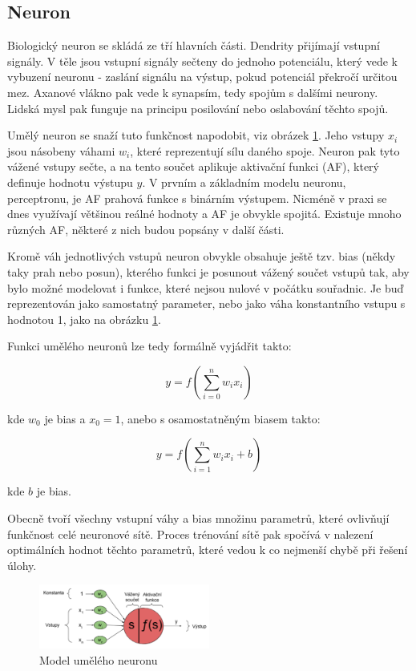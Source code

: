 \subsection{Neuron}
Biologický neuron se skládá ze tří hlavních části. Dendrity přijímají vstupní
signály. V těle jsou vstupní signály sečteny do jednoho potenciálu, který vede
k vybuzení neuronu - zaslání signálu na výstup, pokud potenciál překročí
určitou mez. Axanové vlákno pak vede k synapsím, tedy spojům s dalšími neurony.
Lidská mysl pak funguje na principu posilování nebo oslabování těchto spojů.

Umělý neuron se snaží tuto funkčnost napodobit, viz obrázek \ref{fig:neuron}.
Jeho vstupy $x_i$ jsou násobeny váhami $w_i$, které reprezentují sílu daného
spoje. Neuron pak tyto vážené vstupy sečte, a na tento součet aplikuje
aktivační funkci (AF), který definuje hodnotu výstupu $y$. V prvním a základním
modelu neuronu, perceptronu, je AF prahová funkce s binárním výstupem. Nicméně
v praxi se dnes využívají většinou reálné hodnoty a AF je obvykle spojitá.
\cite{Vondrak1994} Existuje mnoho různých AF, některé z nich budou popsány v
další části.

Kromě váh jednotlivých vstupů neuron obvykle obsahuje ještě tzv. bias (někdy
taky prah nebo posun), kterého funkci je posunout vážený součet vstupů tak, aby
bylo možné modelovat i funkce, které nejsou nulové v počátku souřadnic. Je buď
reprezentován jako samostatný parameter, nebo jako váha konstantního vstupu s
hodnotou 1, jako na obrázku \ref{fig:neuron}.

Funkci umělého neuronů lze tedy formálně vyjádřit takto:

\begin{equation*}
    y=f\left(\sum_{i=0}^{n}w_{i}x_{i}\right)
\end{equation*}

kde $w_0$ je bias a $x_0=1$, anebo s osamostatněným biasem takto:

\begin{equation*}
    y = f\left(\sum_{i=1}^{n} w_i x_i + b\right)
\end{equation*}

kde $b$ je bias.

Obecně tvoří všechny vstupní váhy a bias množinu parametrů, které ovlivňují
funkčnost celé neuronové sítě. Proces trénování sítě pak spočívá v nalezení
optimálních hodnot těchto parametrů, které vedou k co nejmenší chybě při řešení
úlohy.

\begin{figure}[]
    \centering
    \includegraphics[width=0.5\textwidth]{Figures/neuron.png}
    \caption{Model umělého neuronu \cite{lagan}}
    \label{fig:neuron}
\end{figure}

